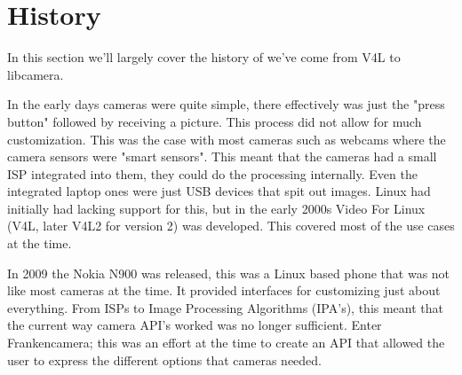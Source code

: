 \section{History}
In this section we'll largely cover the history of we've come from V4L to
libcamera.

In the early days cameras were quite simple, there effectively was just the
"press button" followed by receiving a picture. This process did not allow for
much customization. This was the case with most cameras such as webcams where
the camera sensors were "smart sensors". This meant that the cameras had a small
ISP integrated into them, they could do the processing internally. Even the
integrated laptop ones were just USB devices that spit out images. Linux had
initially had lacking support for this, but in the early 2000s Video For Linux
(V4L, later V4L2 for version 2) was developed. This covered most of the use
cases at the time.

In 2009 the Nokia N900 was released, this was a Linux based phone that was not
like most cameras at the time. It provided interfaces for customizing just
about everything. From ISPs to Image Processing Algorithms (IPA's), this meant
that the current way camera API's worked was no longer sufficient. Enter
Frankencamera\cite{adams2010frankencamera}; this was an effort at the time
to create an API that allowed the user to express the different options that
cameras needed.
